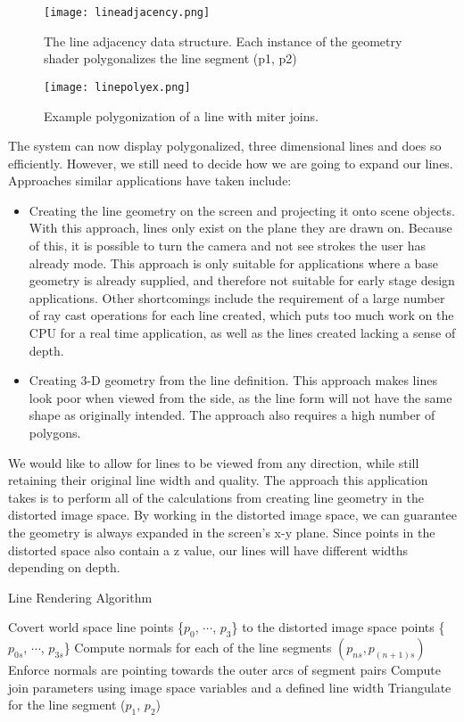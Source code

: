 \begin{figure}
	\begin{center}
		\texttt{[image: lineadjacency.png]}
	\end{center}
	\caption{The line adjacency data structure. Each instance of the geometry shader polygonalizes the line segment (p1, p2)}
\end{figure}
\begin{figure}
	\texttt{[image: linepolyex.png]}
	\caption{Example polygonization of a line with miter joins.}
\end{figure}



The system can now display polygonalized, three dimensional lines and does so efficiently.
However, we still need to decide how we are going to expand our lines.
Approaches similar applications have taken include: 
\begin{itemize}
\item Creating the line geometry on the screen and projecting it onto scene objects. With this approach, lines only exist on the plane they are drawn on. Because of this, it is possible to turn the camera and not see strokes the user has already mode. This approach is only suitable for applications where a base geometry is already supplied, and therefore not suitable for early stage design applications. Other shortcomings include the requirement of a large number of ray cast operations for each line created, which puts too much work on the CPU for a real time application, as well as the lines created lacking a sense of depth.
\item Creating 3-D geometry from the line definition. This approach makes lines look poor when viewed from the side, as the line form will not have the same shape as originally intended. The approach also requires a high number of polygons.
\end{itemize}

We would like to allow for lines to be viewed from any direction, while still retaining their original line width and quality.
The approach this application takes is to perform all of the calculations from creating line geometry in the distorted image space.
By working in the distorted image space, we can guarantee the geometry is always expanded in the screen's x-y plane.
Since points in the distorted space also contain a z value, our lines will have different widths depending on depth.

\begin{algorithm}[H]
\caption{Line Rendering Algorithm}
\begin{algorithmic}[1]
\State Covert world space line points \{$p_0$, $\cdots$, $p_3$\} to the distorted image space points \{$p_{0s}$, $\cdots$, $p_{3s}$\}
\State Compute normals for each of the line segments $(p_{ns},p_{(n+1)s})$
\State Enforce normals are pointing towards the outer arcs of segment pairs
\State Compute join parameters using image space variables and a defined line width
\State Triangulate for the line segment ($p_1$, $p_2$)
\EndFor
\end{algorithmic}
\end{algorithm}

